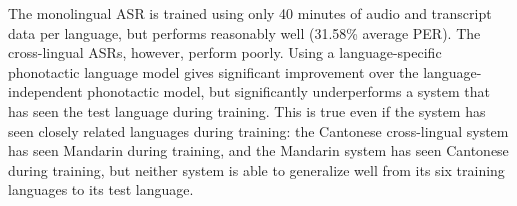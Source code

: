 The monolingual ASR is trained using only 40 minutes of audio and
transcript data per language, but performs reasonably well (31.58\%
average PER).  The cross-lingual ASRs, however, perform poorly.
Using a language-specific phonotactic language model gives
significant improvement over the language-independent phonotactic
model, but significantly underperforms a system that
has seen the test language during training.  This is true
even if the system has seen closely related languages during training:
the Cantonese cross-lingual system has seen Mandarin during training,
and the Mandarin system has seen Cantonese during training, but
neither system is able to generalize well from its six training languages to
its test language.

